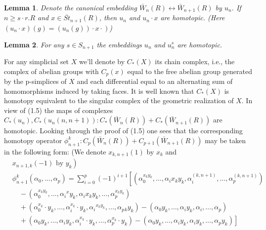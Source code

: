 \documentclass{book}
\newtheorem{lemm}{Lemma}
\begin{document}
\begin{lemm}
Denote the canonical embedding $\bar{W}_n(R) \longleftrightarrow \bar{W}_{n+1}(R)$ by $u_n$. If $n \geq s \cdot r . R$ and $x \in \overline{S t}_{n+1}(R)$, then $u_n$ and $u_n \cdot x$ are homotopic. (Here $\left.\left(u_n \cdot x\right)(g)=\left(u_n(g)\right) \cdot x \cdot\right)$)
\end{lemm}

\begin{lemm}
For any $s \in S_{n+1}$ the embeddings $u_n$ and $u_n^s$ are homotopic.   
\end{lemm}


For any simplicial set $X$ we'll denote by $C_*(X)$ its chain complex, i.e., the complex of abelian groups with $C_p(x)$ equal to the free abelian group generated by the p-simplices of $X$ and each differential equal to an alternating sum of homomorphisms induced by taking faces. It is well known that $C_*(X)$ is homotopy equivalent to the singular complex of the geometric realization of $X$. In view of (1.5) the maps of complexes $C_*\left(u_n\right), C_*\left(u_n(n, n+1)\right): C_*\left(\bar{W}_n(R)\right)+C_*\left(\bar{W}_{n+1}(R)\right)$ are homotopic. Looking through the proof of (1.5) one sees that the corresponding homotopy operator $\phi_{n+1}^k: C_p\left(\bar{W}_n(R)\right)+C_{p+1}\left(\bar{W}_{n+1}(R)\right)$ may be taken in the following form: (We denote $x_{k, n+1}(1)$ by $x_k$ and
$$
\begin{aligned}
& \left.x_{n+1, k}(-1) \text { by } y_k\right) \\
& \phi_{n+1}^k\left(\alpha_0, \ldots, \alpha_p\right)=\sum_{i=0}^p(-1)^{i+1}\left[\left(\alpha_0^{x_k y_k}, \ldots, \alpha_i x_k y_k, \alpha_i^{(k, n+1)}, \ldots, \alpha_p^{(k, n+1)}\right)\right. \\
& \quad-\left(\alpha_0^{x_k y_k}, \ldots, \alpha_i{ }^x y_k, \alpha_i x_k y_k, \ldots, \alpha_p^{x_k y_k}\right) \\
& \quad+\left(\alpha_0^{x_k} \cdot y_k, \ldots, \alpha_i^{x_k} \cdot y_k, \alpha_i{ }^{x_k y_k}, \ldots, \alpha_p{ }_k y_k\right)-\left(\alpha_0 y_k, \ldots, \alpha_i y_k, \alpha_i, \ldots, \alpha_p\right) \\
& \left.\quad+\left(\alpha_0 y_k, \ldots, \alpha_i y_k, \alpha_i^{x_k} \cdot y_k, \ldots, \alpha_p^{x_k} \cdot y_k\right)-\left(\alpha_0 y_k, \ldots, \alpha_i y_k, \alpha_i y_k, \ldots, \alpha_p y_k\right)\right]
\end{aligned}
$$
\end{document}
